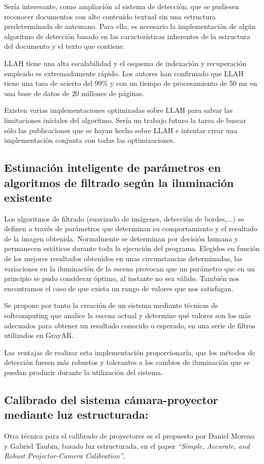Sería interesante, como ampliación al sistema de detección, que se pudiesen reconocer documentos con alto contenido textual sin una estructura predeterminada de antemano. Para ello, es necesario la implementación de algún algoritmo de detección basado en las características inherentes de la estructura del documento y el texto que contiene. 

LLAH \cite{Nakai} tiene una alta escalabilidad y el esquema de indexación y recuperación empleado es extremadamente rápido. Los autores han confirmado que LLAH tiene una tasa de acierto del 99\% y con un tiempo de procesamiento de 50 ms en una base de datos de 20 millones de páginas. 

Existen varias implementaciones optimizadas sobre LLAH para salvar las limitaciones iniciales del algoritmo. Sería un trabajo futuro la tarea de buscar sólo las publicaciones que se hayan hecho sobre LLAH e intentar crear una implementación conjunta con todas las optimizaciones.

\subsection{Estimación inteligente de parámetros en algoritmos de filtrado según la iluminación existente}
Los algoritmos de filtrado (suavizado de imágenes, detección de bordes,...) se definen a través de parámetros que determinan su comportamiento y el resultado de la imagen obtenida. Normalmente se determinan por decisión humana y permanecen estáticos durante toda la ejecución del programa. Elegidos en función de los mejores resultados obtenidos en unas circunstancias determinadas, las variaciones en la iluminación de la escena provocan que un parámetro que en un principio se pudo considerar óptimo, al instante no sea válido. También nos encontramos el caso de que exista un rango de valores que nos satisfagan.

Se propone por tanto la creación de un sistema mediante técnicas de softcomputing que analice la escena actual y determine qué valores son los más adecuados para obtener un resultado conocido o esperado, en una serie de filtros utilizados en GrayAR.

Las ventajas de realizar esta implementación proporcionaría, que los métodos de detección fuesen más robustos y tolerantes a los cambios de iluminación que se puedan producir durante la utilización del sistema.    

\subsection{Calibrado del sistema cámara-proyector mediante luz estructurada:} 
Otra técnica para el calibrado de proyectores es el propuesto por Daniel Moreno y Gabriel Taubin, basado luz estructurada, en el paper \textit{``Simple, Accurate, and Robust Projector-Camera Calibration''}. 

